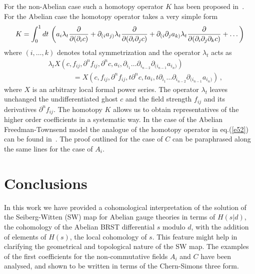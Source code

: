 \documentclass[a4paper,12pt]{article}
\begin{document}
For the non-Abelian case such a homotopy operator $K$ has been proposed
 in~\cite{Brace:2001fj}.
For the Abelian case the homotopy operator takes a very simple
 form~\cite{Zumino:Ed.ew}
%
\begin{eqnarray}
K = \int_0^1 dt \, \left ( 
a_i \lambda_t {\partial \over \partial (\partial_i c)} + 
\partial_{(i} a_{j)} \lambda_t 
{\partial \over \partial (\partial_i \partial_j c)} +
\partial_{(i}\partial_{j} a_{k)} \lambda_t {\partial \over \partial (\partial_i \partial_j \partial_k c)} + \dots 
\right )
\label{e52}
\end{eqnarray}
%
where $(i,\dots,k)$ denotes total symmetrization and the operator
 $\lambda_t$ acts as
%
\begin{eqnarray}
&&\lambda_t 
X(c,f_{ij},\partial^n f_{ij},\partial^n c, a_i,
 \partial_{i_1}\dots\partial_{i_{n-2}}\partial_{(i_{n-1}} a_{i_n)}) 
\nonumber\\
&&~~~~~~~~~~~~~~~~= X(c,f_{ij},\partial^n f_{ij},t\partial^n c, t a_i,
 t  \partial_{i_1}\dots\partial_{i_{n-2}}\partial_{(i_{n-1}} a_{i_n)}) \, ,
\label{e52.bis}
\end{eqnarray}
%
where $X$ is an arbitrary local formal power series.
The operator $\lambda_t$ leaves unchanged the undifferentiated ghost $c$ and
 the field strength $f_{ij}$ and its derivatives $\partial^n f_{ij}$.
The homotopy $K$ allows us to obtain representatives of the higher
 order coefficients in a systematic way.
In the case of the Abelian Freedman-Townsend model the analogue of the
 homotopy operator in eq.(\ref{e52}) can be found in~\cite{Barnich:2001mc}.
The proof outlined for the case of $C$ can be paraphrased  
 along the same lines for the case of $A_i$.


\section{Conclusions}
 
In this work we have provided a cohomological interpretation of the solution
 of the Seiberg-Witten (SW) map for Abelian gauge theories in terms
 of $H(s|d)$, the cohomology of the Abelian BRST differential $s$
 modulo $d$, with the addition of elements of $H(s)$, the local cohomology
 of $s$.
This feature might help in clarifying the geometrical and topological nature
 of the SW map.
The examples of the first coefficients for the non-commutative fields
 $A_i$ and $C$ have been analysed, and shown to be written in terms 
 of the Chern-Simons three form.
\end{document}

